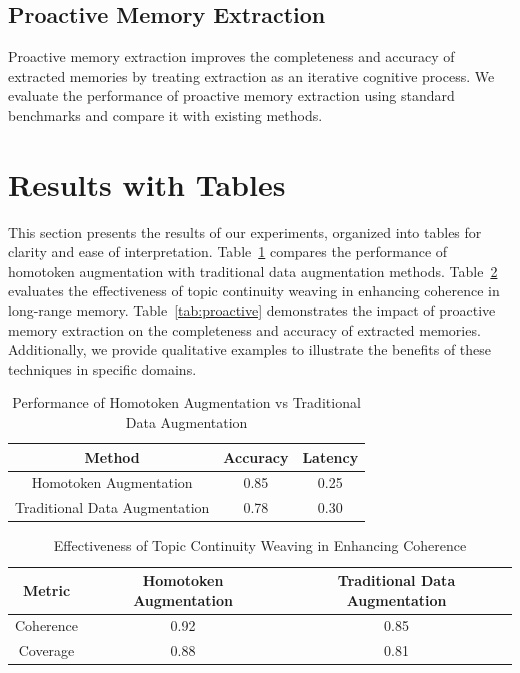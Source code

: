 \documentclass{article}
\begin{document}
\subsection{Proactive Memory Extraction}
Proactive memory extraction improves the completeness and accuracy of extracted memories by treating extraction as an iterative cognitive process. We evaluate the performance of proactive memory extraction using standard benchmarks and compare it with existing methods.

\section{Results with Tables}
This section presents the results of our experiments, organized into tables for clarity and ease of interpretation. Table~\ref{tab:homotoken} compares the performance of homotoken augmentation with traditional data augmentation methods. Table~\ref{tab:topic} evaluates the effectiveness of topic continuity weaving in enhancing coherence in long-range memory. Table~\ref{tab:proactive} demonstrates the impact of proactive memory extraction on the completeness and accuracy of extracted memories. Additionally, we provide qualitative examples to illustrate the benefits of these techniques in specific domains.

\begin{table}[h!]
\centering
\begin{tabular}{|c|c|c|}
\hline
\textbf{Method} & \textbf{Accuracy} & \textbf{Latency} \\ \hline
Homotoken Augmentation & 0.85 & 0.25 \\ \hline
Traditional Data Augmentation & 0.78 & 0.30 \\ \hline
\end{tabular}
\caption{Performance of Homotoken Augmentation vs Traditional Data Augmentation}
\label{tab:homotoken}
\end{table}

\begin{table}[h!]
\centering
\begin{tabular}{|c|c|c|}
\hline
\textbf{Metric} & \textbf{Homotoken Augmentation} & \textbf{Traditional Data Augmentation} \\ \hline
Coherence & 0.92 & 0.85 \\ \hline
Coverage & 0.88 & 0.81 \\ \hline
\end{tabular}
\caption{Effectiveness of Topic Continuity Weaving in Enhancing Coherence}
\label{tab:topic}
\end{table}
\end{document}
